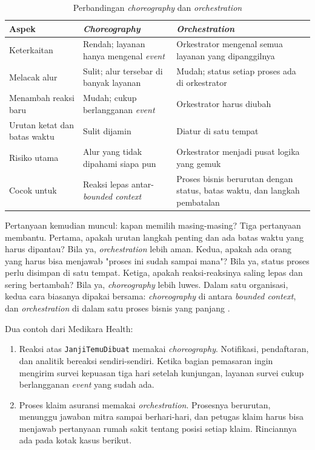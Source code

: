 \begin{table}[!htb]
  \centering
  \caption{Perbandingan \textit{choreography} dan \textit{orchestration}}
  \label{tab:ch09-koordinasi}
  \footnotesize
  \begin{tabularx}{\textwidth}{>{\raggedright\arraybackslash}p{2.4cm} >{\raggedright\arraybackslash}X >{\raggedright\arraybackslash}X}
    \hline
    \textbf{Aspek} & \textbf{\textit{Choreography}} & \textbf{\textit{Orchestration}} \\ \hline
    Keterkaitan & Rendah; layanan hanya mengenal \textit{event} & Orkestrator mengenal semua layanan
      yang dipanggilnya \\ \hline
    Melacak alur & Sulit; alur tersebar di banyak layanan & Mudah; status setiap proses ada di
      orkestrator \\ \hline
    Menambah reaksi baru & Mudah; cukup berlangganan \textit{event} & Orkestrator harus diubah \\
      \hline
    Urutan ketat dan batas waktu & Sulit dijamin & Diatur di satu tempat \\ \hline
    Risiko utama & Alur yang tidak dipahami siapa pun & Orkestrator menjadi pusat logika yang
      gemuk \\ \hline
    Cocok untuk & Reaksi lepas antar-\textit{bounded context} & Proses bisnis berurutan dengan
      status, batas waktu, dan langkah pembatalan \\ \hline
  \end{tabularx}
\end{table}

Pertanyaan kemudian muncul: kapan memilih masing-masing? Tiga pertanyaan membantu. Pertama, apakah
urutan langkah penting dan ada batas waktu yang harus dipantau? Bila ya, \textit{orchestration} lebih
aman. Kedua, apakah ada orang yang harus bisa menjawab "proses ini sudah sampai mana"? Bila ya,
status proses perlu disimpan di satu tempat. Ketiga, apakah reaksi-reaksinya saling lepas dan sering
bertambah? Bila ya, \textit{choreography} lebih luwes. Dalam satu organisasi, kedua cara biasanya
dipakai bersama: \textit{choreography} di antara \textit{bounded context}, dan \textit{orchestration}
di dalam satu proses bisnis yang panjang \cite{newman2021}.

Dua contoh dari Medikara Health:
\begin{enumerate}
  \item Reaksi atas \texttt{JanjiTemuDibuat} memakai \textit{choreography}. Notifikasi, pendaftaran,
        dan analitik bereaksi sendiri-sendiri. Ketika bagian pemasaran ingin mengirim survei
        kepuasan tiga hari setelah kunjungan, layanan survei cukup berlangganan \textit{event} yang
        sudah ada.
  \item Proses klaim asuransi memakai \textit{orchestration}. Prosesnya berurutan, menunggu jawaban
        mitra sampai berhari-hari, dan petugas klaim harus bisa menjawab pertanyaan rumah sakit
        tentang posisi setiap klaim. Rinciannya ada pada kotak kasus berikut.
\end{enumerate}

